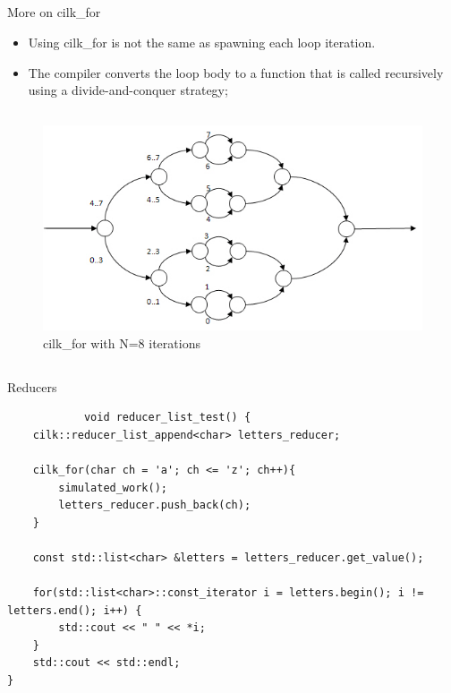 \documentclass{beamer}
\begin{document}
\subsection{}
\begin{frame}
	\begin{block}{More on cilk\_for}
		\begin{itemize}
			\item Using cilk\_for is not the same as spawning each loop iteration.
			\item The compiler converts the loop body to a function that is called recursively using a divide-and-conquer strategy;
		\end{itemize}
	\end{block}
\end{frame}

\subsection{}
\begin{frame}
		\begin{figure}[!htb]
			\centering
			\includegraphics[scale=1]{images/cilkfor.jpg}
			\caption{cilk\_for with N=8 iterations}
			\label{roofline}
		\end{figure}

\end{frame}

\subsection{}
\begin{frame}[fragile]
	\begin{block}{Reducers}					
		\begin{lstlisting}
			void reducer_list_test() {
    cilk::reducer_list_append<char> letters_reducer;

    cilk_for(char ch = 'a'; ch <= 'z'; ch++){
        simulated_work();
        letters_reducer.push_back(ch);
    }

    const std::list<char> &letters = letters_reducer.get_value();

    for(std::list<char>::const_iterator i = letters.begin(); i != letters.end(); i++) {
        std::cout << " " << *i;
    }
    std::cout << std::endl;
}
		\end{lstlisting}
	\end{block}
\end{frame}
\end{document}
